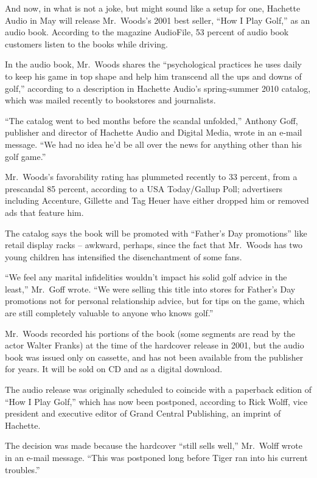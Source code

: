 ﻿\documentclass[12pt]{article}
\begin{document}
And now, in what is not a joke, but might sound like a setup for one, Hachette Audio in May will
release Mr.~Woods's 2001 best seller, ``How I Play Golf,'' as an audio book. According to the
magazine AudioFile, 53 percent of audio book customers listen to the books while driving.

In the audio book, Mr.~Woods shares the ``psychological practices he uses daily to keep his game in
top shape and help him transcend all the ups and downs of golf,'' according to a description in
Hachette Audio's spring-summer 2010 catalog, which was mailed recently to bookstores and
journalists.

``The catalog went to bed months before the scandal unfolded,'' Anthony Goff, publisher and director
of Hachette Audio and Digital Media, wrote in an e-mail message. ``We had no idea he'd be all over
the news for anything other than his golf game.''

Mr.~Woods's favorability rating has plummeted recently to 33 percent, from a prescandal 85 percent,
according to a USA Today/Gallup Poll; advertisers including Accenture, Gillette and Tag Heuer have
either dropped him or removed ads that feature him.

The catalog says the book will be promoted with ``Father's Day promotions'' like retail display
racks -- awkward, perhaps, since the fact that Mr.~Woods has two young children has intensified the
disenchantment of some fans.

``We feel any marital infidelities wouldn't impact his solid golf advice in the least,'' Mr.~Goff
wrote. ``We were selling this title into stores for Father's Day promotions not for personal
relationship advice, but for tips on the game, which are still completely valuable to anyone who
knows golf.''

Mr.~Woods recorded his portions of the book (some segments are read by the actor Walter Franks) at
the time of the hardcover release in 2001, but the audio book was issued only on cassette, and has
not been available from the publisher for years. It will be sold on CD and as a digital download.

The audio release was originally scheduled to coincide with a paperback edition of ``How I Play
Golf,'' which has now been postponed, according to Rick Wolff, vice president and executive editor
of Grand Central Publishing, an imprint of Hachette.

The decision was made because the hardcover ``still sells well,'' Mr.~Wolff wrote in an e-mail
message. ``This was postponed long before Tiger ran into his current troubles.''
\end{document}
